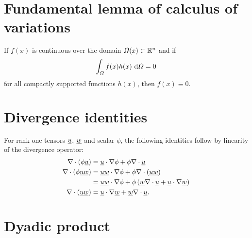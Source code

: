 \section{Fundamental lemma of calculus of variations}

\begin{lemma}
\label{fundamental_lemma}
If $f(x)$ is continuous over the domain $\varOmega(x) \subset \mathbb{R}^n$ and if
\begin{align*}
  \int_{\varOmega} f(x) h(x) \ \mathrm{d}\varOmega = 0
\end{align*}
for all compactly supported functions $h(x)$, then $f(x) \equiv 0$.
\end{lemma}

\section{Divergence identities} \label{ssn_divergence_identities}

For rank-one tensors $\underline{u}$, $\underline{w}$ and scalar $\phi$, the following identities follow by linearity of the divergence operator:
\begin{align}
  \label{divergence_identity_1}
  \nabla \cdot \left( \phi \underline{u} \right) &= \underline{u} \cdot \nabla \phi + \phi \nabla \cdot \underline{u}  \\
  \nabla \cdot \left( \phi \underline{u} \underline{w} \right) &= \underline{u} \underline{w} \cdot \nabla \phi + \phi \nabla \cdot \left( \underline{u} \underline{w} \right) \notag \\
  \label{divergence_identity_2}
  &= \underline{u} \underline{w} \cdot \nabla \phi + \phi \left( \underline{w} \nabla \cdot \underline{u} + \underline{u} \cdot \nabla \underline{w} \right) \\
  \label{divergence_identity_3}
  \nabla \cdot \left( \underline{u} \underline{w} \right) &= \underline{u} \cdot \nabla \underline{w} + \underline{w} \nabla \cdot \underline{u}.
\end{align}

\section{Dyadic product}

